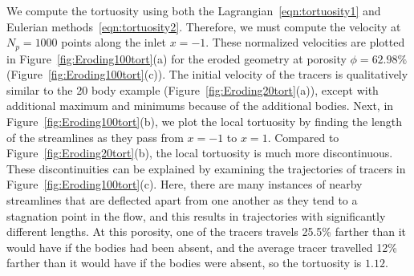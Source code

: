 \documentclass[preprint,10pt]{elsarticle}
\begin{document}
We compute the tortuosity using both the
Lagrangian~\eqref{eqn:tortuosity1} and Eulerian
methods~\eqref{eqn:tortuosity2}. Therefore, we must compute the velocity
at $N_p = 1000$ points along the inlet $x=-1$. These normalized
velocities are plotted in Figure~\ref{fig:Eroding100tort}(a) for the
eroded geometry at porosity $\phi = 62.98\%$
(Figure~\ref{fig:Eroding100tort}(c)).  The initial velocity of the
tracers is qualitatively similar to the 20 body example
(Figure~\ref{fig:Eroding20tort}(a)), except with additional maximum and
minimums because of the additional bodies.  Next, in
Figure~\ref{fig:Eroding100tort}(b), we plot the local tortuosity by
finding the length of the streamlines as they pass from $x=-1$ to $x=1$.
Compared to Figure~\ref{fig:Eroding20tort}(b), the local tortuosity is
much more discontinuous.  These discontinuities can be explained by
examining the trajectories of tracers in
Figure~\ref{fig:Eroding100tort}(c).  Here, there are many instances of
nearby streamlines that are deflected apart from one another as they
tend to a stagnation point in the flow, and this results in trajectories
with significantly different lengths.  At this porosity, one of the
tracers travels 25.5\% farther than it would have if the bodies had been
absent, and the average tracer travelled 12\% farther than it would have
if the bodies were absent, so the tortuosity is $1.12$.
\end{document}
